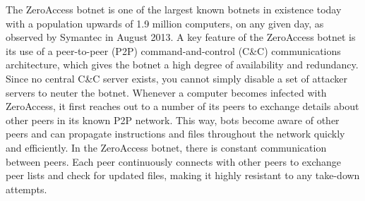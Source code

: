 \cite{zeroaccess-symantec-blog,zeroaccess-symantec-definition}The ZeroAccess botnet is one of the largest known botnets in existence today with a population upwards of 1.9 million computers, on any given day, as observed by Symantec in August 2013. A key feature of the ZeroAccess botnet is its use of a peer-to-peer (P2P) command-and-control (C\&C) communications architecture, which gives the botnet a high degree of availability and redundancy. Since no central C\&C server exists, you cannot simply disable a set of attacker servers to neuter the botnet. Whenever a computer becomes infected with ZeroAccess, it first reaches out to a number of its peers to exchange details about other peers in its known P2P network. This way, bots become aware of other peers and can propagate instructions and files throughout the network quickly and efficiently. In the ZeroAccess botnet, there is constant communication between peers. Each peer continuously connects with other peers to exchange peer lists and check for updated files, making it highly resistant to any take-down attempts. 
